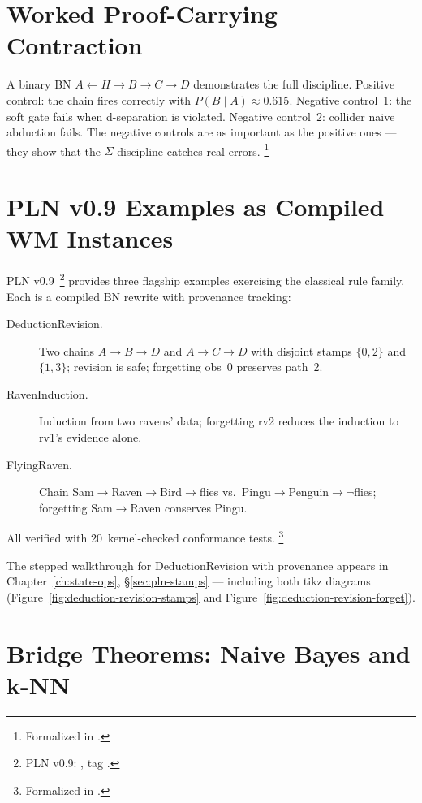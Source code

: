 \documentclass[11pt,openany]{report}
\begin{document}
\section{Worked Proof-Carrying Contraction}

A binary BN $A \leftarrow H \to B \to C \to D$ demonstrates the full
discipline.  Positive control: the chain fires correctly with
$P(B \mid A) \approx 0.615$.  Negative control~1: the soft gate
fails when d-separation is violated.  Negative control~2: collider
naive abduction fails.  The negative controls are as important as
the positive ones --- they show that the $\Sigma$-discipline catches
real errors.%
\footnote{Formalized in
.}


\section{PLN v0.9 Examples as Compiled WM Instances}

PLN v0.9~\cite{goertzel2009pln}\footnote{PLN v0.9:
, tag .} provides
three flagship examples exercising the classical rule family.  Each
is a compiled BN rewrite with provenance tracking:

\begin{description}
\item[DeductionRevision.]  Two chains $A \to B \to D$ and
  $A \to C \to D$ with disjoint stamps $\{0,2\}$ and $\{1,3\}$;
  revision is safe; forgetting obs~0 preserves path~2.

\item[RavenInduction.]  Induction from two ravens' data; forgetting
  rv2 reduces the induction to rv1's evidence alone.

\item[FlyingRaven.]  Chain Sam$\to$Raven$\to$Bird$\to$flies vs.\
  Pingu$\to$Penguin$\to\neg$flies; forgetting Sam$\to$Raven
  conserves Pingu.
\end{description}

\noindent
All verified with 20~kernel-checked conformance tests.%
\footnote{Formalized in
.}

The stepped walkthrough for DeductionRevision with provenance
appears in Chapter~\ref{ch:state-ops},
\S\ref{sec:pln-stamps} --- including both tikz diagrams
(Figure~\ref{fig:deduction-revision-stamps} and
Figure~\ref{fig:deduction-revision-forget}).


\section{Bridge Theorems: Naive Bayes and k-NN}
\label{sec:bridge-nb-knn}
\end{document}
